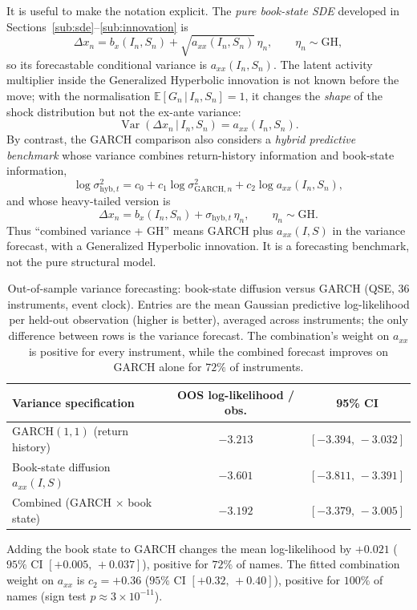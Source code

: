 \documentclass[11pt]{article}
\theoremstyle{plain}
\theoremstyle{definition}
\newcommand{\E}{\mathbb{E}}
\newcommand{\Var}{\operatorname{Var}}
\newcommand{\given}{\,\vert\,}
\newcommand{\GH}{\mathrm{GH}}
\newcommand{\axx}{a_{xx}}
\begin{document}
It is useful to make the notation explicit. The \emph{pure book-state SDE} developed
in Sections~\ref{sub:sde}--\ref{sub:innovation} is
\begin{equation}
  \Delta x_n
  =
  b_x(I_n,S_n)
  +
  \sqrt{\axx(I_n,S_n)}\,\eta_n,
  \qquad \eta_n \sim \GH,
  \label{eq:pure-book-sde}
\end{equation}
so its forecastable conditional variance is $\axx(I_n,S_n)$. The latent activity
multiplier inside the Generalized Hyperbolic innovation is not known before the move;
with the normalisation $\E[G_n\given I_n,S_n]=1$, it changes the \emph{shape} of the
shock distribution but not the ex-ante variance:
\[
  \Var(\Delta x_n\given I_n,S_n)=\axx(I_n,S_n).
\]
By contrast, the GARCH comparison also considers a \emph{hybrid predictive benchmark}
whose variance combines return-history information and book-state information,
\begin{equation}
  \log \sigma^2_{\mathrm{hyb},t}
  =
  c_0
  +
  c_1\log \sigma^2_{\mathrm{GARCH},n}
  +
  c_2\log \axx(I_n,S_n),
  \label{eq:hybrid-variance}
\end{equation}
and whose heavy-tailed version is
\begin{equation}
  \Delta x_n
  =
  b_x(I_n,S_n)
  +
  \sigma_{\mathrm{hyb},t}\,\eta_n,
  \qquad \eta_n \sim \GH.
  \label{eq:hybrid-gh}
\end{equation}
Thus ``combined variance + GH'' means GARCH plus $\axx(I,S)$ in the variance
forecast, with a Generalized Hyperbolic innovation. It is a forecasting benchmark,
not the pure structural model.

\begin{table}[!htbp]
\centering
\caption{Out-of-sample variance forecasting: book-state diffusion versus GARCH
(QSE, $36$ instruments, event clock). Entries are the mean Gaussian predictive
log-likelihood per held-out observation (higher is better), averaged across
instruments; the only difference between rows is the variance forecast. The
combination's weight on $\axx$ is positive for every instrument, while the combined
forecast improves on GARCH alone for $72\%$ of instruments.}
\label{tab:garch}
\small
\begin{tabular}{@{}lcc@{}}
\toprule
Variance specification & OOS log-likelihood / obs. & 95\% CI \\
\midrule
GARCH$(1,1)$ (return history)        & $-3.213$ & $[-3.394,\,-3.032]$ \\
Book-state diffusion $\axx(I,S)$     & $-3.601$ & $[-3.811,\,-3.391]$ \\
Combined (GARCH $\times$ book state) & $\mathbf{-3.192}$ & $[-3.379,\,-3.005]$ \\
\bottomrule
\end{tabular}
\begin{flushleft}
\footnotesize
Adding the book state to GARCH changes the mean log-likelihood by
$+0.021$ ($95\%$ CI $[+0.005,\,+0.037]$), positive for $72\%$ of names.
The fitted combination weight on $\axx$ is $c_2=+0.36$
($95\%$ CI $[+0.32,\,+0.40]$), positive for $100\%$ of names
(sign test $p\approx3\times10^{-11}$).
\end{flushleft}
\end{table}
\end{document}
